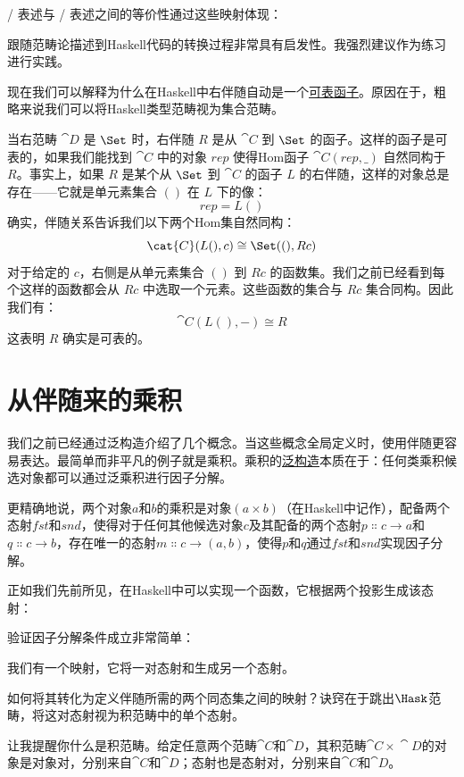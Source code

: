 / 表述与 /\allowbreak{} 表述之间的等价性通过这些映射体现：

跟随范畴论描述到Haskell代码的转换过程非常具有启发性。我强烈建议作为练习进行实践。

现在我们可以解释为什么在Haskell中右伴随自动是一个\hyperref[representable-functors]{可表函子}。原因在于，粗略来说我们可以将Haskell类型范畴视为集合范畴。

当右范畴 $\cat{D}$ 是 $\Set$ 时，右伴随 $R$ 是从 $\cat{C}$ 到 $\Set$ 的函子。这样的函子是可表的，如果我们能找到 $\cat{C}$ 中的对象 $\mathit{rep}$ 使得Hom函子 $\cat{C}(\mathit{rep}, \_)$ 自然同构于 $R$。事实上，如果 $R$ 是某个从 $\Set$ 到 $\cat{C}$ 的函子 $L$ 的右伴随，这样的对象总是存在——它就是单元素集合 $()$ 在 $L$ 下的像：
\[\mathit{rep} = L ()\]
确实，伴随关系告诉我们以下两个Hom集自然同构：
\[\cat{C}(L (), c) \cong \Set((), R c)\]
对于给定的 $c$，右侧是从单元素集合 $()$ 到 $R c$ 的函数集。我们之前已经看到每个这样的函数都会从 $R c$ 中选取一个元素。这些函数的集合与 $R c$ 集合同构。因此我们有：
\[\cat{C}(L (), -) \cong R\]
这表明 $R$ 确实是可表的。

\section{从伴随来的乘积}

我们之前已经通过泛构造介绍了几个概念。当这些概念全局定义时，使用伴随更容易表达。最简单而非平凡的例子就是乘积。乘积的\hyperref[products-and-coproducts]{泛构造}本质在于：任何类乘积候选对象都可以通过泛乘积进行因子分解。

更精确地说，两个对象$a$和$b$的乘积是对象$(a\times{}b)$（在Haskell中记作），配备两个态射$\mathit{fst}$和$\mathit{snd}$，使得对于任何其他候选对象$c$及其配备的两个态射$p \Colon c \to a$和$q \Colon c \to b$，存在唯一的态射$m \Colon c \to (a, b)$，使得$p$和$q$通过$\mathit{fst}$和$\mathit{snd}$实现因子分解。

正如我们先前所见，在Haskell中可以实现一个函数，它根据两个投影生成该态射：

验证因子分解条件成立非常简单：

我们有一个映射，它将一对态射和生成另一个态射。

如何将其转化为定义伴随所需的两个同态集之间的映射？诀窍在于跳出$\Hask$范畴，将这对态射视为积范畴中的单个态射。

让我提醒你什么是积范畴。给定任意两个范畴$\cat{C}$和$\cat{D}$，其积范畴$\cat{C}\times{}\cat{D}$的对象是对象对，分别来自$\cat{C}$和$\cat{D}$；态射也是态射对，分别来自$\cat{C}$和$\cat{D}$。


